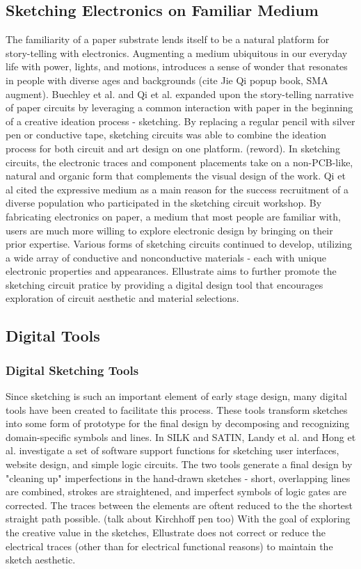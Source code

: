 \documentclass{sigchi}
\begin{document}
\subsection{Sketching Electronics on Familiar Medium}
The familiarity of a paper substrate lends itself to be a natural platform for story-telling with electronics. Augmenting a medium ubiquitous in our everyday life with power, lights, and motions, introduces a sense of wonder that resonates in people with diverse ages and backgrounds \cite{karagozler_paper_2013}(cite Jie Qi popup book, SMA augment). Buechley et al. and Qi et al. expanded upon the story-telling narrative of paper circuits by leveraging a common interaction with paper in the beginning of a creative ideation process - sketching. By replacing a regular pencil with silver pen or conductive tape, sketching circuits was able to combine the ideation process for both circuit and art design on one platform. (reword). In sketching circuits, the electronic traces and component placements take on a non-PCB-like, natural and organic form that complements the visual design of the work. Qi et al cited the expressive medium as a main reason for the success recruitment of a diverse population who participated in the sketching circuit workshop. By fabricating electronics on paper, a medium that most people are familiar with, users are much more willing to explore electronic design by bringing on their prior expertise. Various forms of sketching circuits continued to develop, utilizing a wide array of conductive and nonconductive materials - each with unique electronic properties and appearances.  Ellustrate aims to further promote the sketching circuit pratice by providing a digital design tool that encourages exploration of circuit aesthetic and material selections.
\subsection{Digital Tools}

\subsubsection{Digital Sketching Tools} 
Since sketching is such an important element of early stage design, many digital tools have been created to facilitate this process. These tools transform sketches into some form of prototype for the final design by decomposing and recognizing domain-specific symbols and lines. In SILK and SATIN, Landy et al. and Hong et al. investigate a set of software support functions for sketching user interfaces, website design, and simple logic circuits. The two tools generate a final design by "cleaning up" imperfections in the hand-drawn sketches - short, overlapping lines are combined, strokes are straightened, and imperfect symbols of logic gates are corrected. The traces between the elements are oftent reduced to the the shortest straight path possible. (talk about Kirchhoff pen too) With the goal of exploring the creative value in the sketches, Ellustrate does not correct or reduce the electrical traces (other than for electrical functional reasons) to maintain the sketch aesthetic. 
\end{document}
